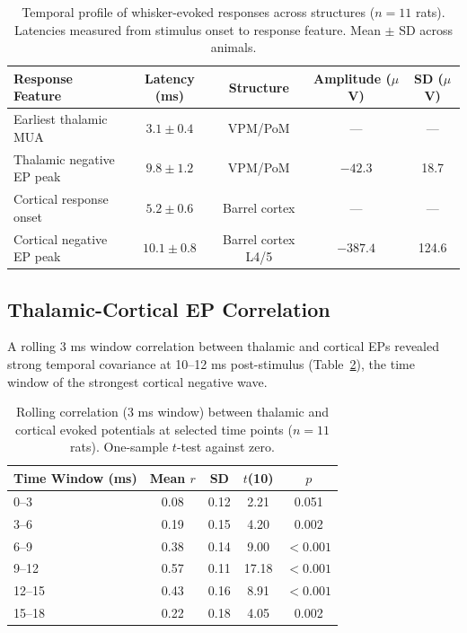 \documentclass[11pt]{article}
\begin{document}
\begin{table}[H]
\centering
\caption{Temporal profile of whisker-evoked responses across structures ($n = 11$ rats). Latencies measured from stimulus onset to response feature. Mean $\pm$ SD across animals.}
\label{tab:temporal}
\begin{tabular}{lcccc}
\toprule
\textbf{Response Feature} & \textbf{Latency (ms)} & \textbf{Structure} & \textbf{Amplitude ($\mu$V)} & \textbf{SD ($\mu$V)} \\
\midrule
Earliest thalamic MUA & $3.1 \pm 0.4$ & VPM/PoM & --- & --- \\
Thalamic negative EP peak & $9.8 \pm 1.2$ & VPM/PoM & $-42.3$ & 18.7 \\
Cortical response onset & $5.2 \pm 0.6$ & Barrel cortex & --- & --- \\
Cortical negative EP peak & $10.1 \pm 0.8$ & Barrel cortex L4/5 & $-387.4$ & 124.6 \\
\bottomrule
\end{tabular}
\end{table}

\subsection{Thalamic-Cortical EP Correlation}

A rolling 3 ms window correlation between thalamic and cortical EPs revealed strong temporal covariance at 10--12 ms post-stimulus (Table~\ref{tab:correlation}), the time window of the strongest cortical negative wave.

\begin{table}[H]
\centering
\caption{Rolling correlation (3 ms window) between thalamic and cortical evoked potentials at selected time points ($n = 11$ rats). One-sample $t$-test against zero.}
\label{tab:correlation}
\begin{tabular}{lcccc}
\toprule
\textbf{Time Window (ms)} & \textbf{Mean $r$} & \textbf{SD} & \textbf{$t$(10)} & \textbf{$p$} \\
\midrule
0--3 & 0.08 & 0.12 & 2.21 & 0.051 \\
3--6 & 0.19 & 0.15 & 4.20 & 0.002 \\
6--9 & 0.38 & 0.14 & 9.00 & $< 0.001$ \\
9--12 & 0.57 & 0.11 & 17.18 & $< 0.001$ \\
12--15 & 0.43 & 0.16 & 8.91 & $< 0.001$ \\
15--18 & 0.22 & 0.18 & 4.05 & 0.002 \\
\bottomrule
\end{tabular}
\end{table}
\end{document}
